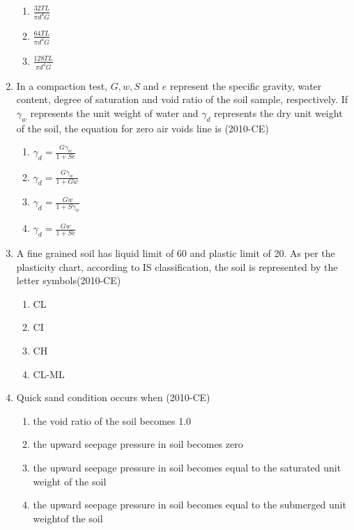 \documentclass[journal,12pt,twocolumn]{IEEEtran}
\theoremstyle{remark}
\begin{document}
\begin{enumerate}
\begin{enumerate}
\item $\frac{32TL}{\pi d^{4} G}$

\item $\frac{64TL}{\pi d^{4} G}$

\item $\frac{128TL}{\pi d^{4} G}$

\end{enumerate}
	
\item  In a compaction test, $G, w, S$ and $e$ represent the specific gravity, water content, degree of saturation and void ratio of the soil sample, respectively. If $\gamma_{w}$ represents the unit weight of water and $\gamma_{d}$ represents the dry unit weight of the soil, the equation for zero air voids line is \hfill{(2010-CE)}

\begin{enumerate}
    \item $\gamma_{d} = \frac{G \gamma_{w}}{1+Se}     $

\item $\gamma_{d} = \frac{G \gamma_{w}}{1+Gw}     $

\item $\gamma_{d} = \frac{Gw} {1+S\gamma_{w}}     $

\item $\gamma_{d} = \frac{Gw}{1+Se}     $

\end{enumerate}
	

\item A fine grained soil has liquid limit of 60 and plastic limit of 20. As per the plasticity chart, according to IS classification, the soil is represented by the letter symbols\hfill{(2010-CE)}

\begin{enumerate}
	\item CL
	\item CI
	\item CH
	\item CL-ML

\end{enumerate}
\item Quick sand condition occurs when	\hfill{(2010-CE)}
	\begin{enumerate}
		\item the void ratio of the soil becomes 1.0
		\item the upward seepage pressure in soil becomes zero
		\item the upward seepage pressure in soil becomes equal to the saturated unit weight of the soil	
		\item the upward seepage pressure in soil becomes equal to the submerged unit weightof the soil
	\end{enumerate}

\end{enumerate}
\end{document}
